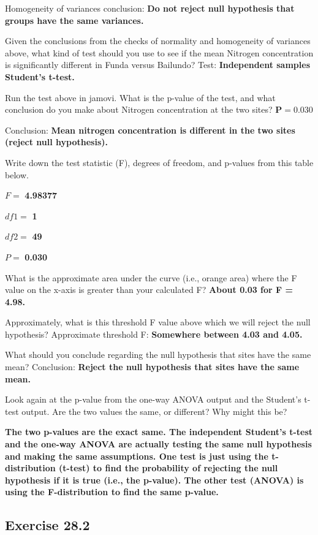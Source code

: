 \documentclass[
  openany]{krantz}
\begin{document}
Homogeneity of variances conclusion: \textbf{Do not reject null hypothesis that groups have the same variances.}

Given the conclusions from the checks of normality and homogeneity of variances above, what kind of test should you use to see if the mean Nitrogen concentration is significantly different in Funda versus Bailundo? Test: \textbf{Independent samples Student's t-test.}

Run the test above in jamovi. What is the p-value of the test, and what conclusion do you make about Nitrogen concentration at the two sites? \textbf{\(\mathbf{P = 0.030}\)}

Conclusion: \textbf{Mean nitrogen concentration is different in the two sites (reject null hypothesis).}

Write down the test statistic (F), degrees of freedom, and p-values from this table below.

\(F =\) \textbf{4.98377}

\(df1 =\) \textbf{1}

\(df2 =\) \textbf{49}

\(P =\) \textbf{0.030}

What is the approximate area under the curve (i.e., orange area) where the F value on the x-axis is greater than your calculated F? \textbf{About 0.03 for F = 4.98.}

Approximately, what is this threshold F value above which we will reject the null hypothesis?
Approximate threshold F: \textbf{Somewhere between 4.03 and 4.05.}

What should you conclude regarding the null hypothesis that sites have the same mean?
Conclusion: \textbf{Reject the null hypothesis that sites have the same mean.}

Look again at the p-value from the one-way ANOVA output and the Student's t-test output. Are the two values the same, or different? Why might this be?

\textbf{The two p-values are the exact same. The independent Student's t-test and the one-way ANOVA are actually testing the same null hypothesis and making the same assumptions. One test is just using the t-distribution (t-test) to find the probability of rejecting the null hypothesis if it is true (i.e., the p-value). The other test (ANOVA) is using the F-distribution to find the same p-value.}

\hypertarget{exercise-28.2}{%
\subsection{Exercise 28.2}\label{exercise-28.2}}
\end{document}
